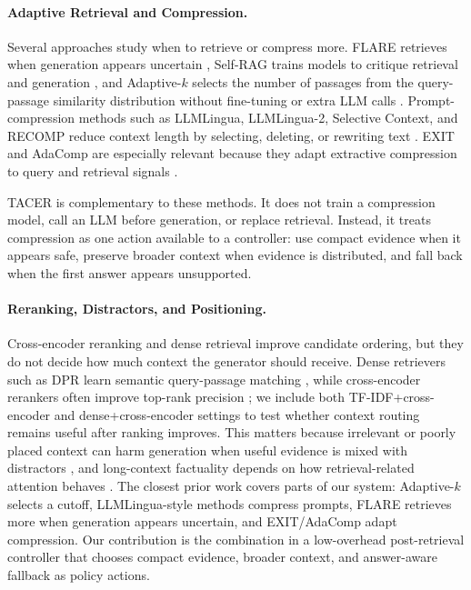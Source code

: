 \documentclass[11pt]{article}
\begin{document}
\paragraph{Adaptive Retrieval and Compression.}
Several approaches study when to retrieve or compress more. FLARE retrieves when generation appears uncertain \citep{jiang2023flare}, Self-RAG trains models to critique retrieval and generation \citep{asai2023selfrag}, and Adaptive-$k$ selects the number of passages from the query-passage similarity distribution without fine-tuning or extra LLM calls \citep{taguchi2025adaptivek}. Prompt-compression methods such as LLMLingua, LLMLingua-2, Selective Context, and RECOMP reduce context length by selecting, deleting, or rewriting text \citep{jiang2023llmlingua,pan2024llmlingua2,li2023selectivecontext,xu2023recomp}. EXIT and AdaComp are especially relevant because they adapt extractive compression to query and retrieval signals \citep{hwang2025exit,zhang2024adacomp}.

TACER is complementary to these methods. It does not train a compression model, call an LLM before generation, or replace retrieval. Instead, it treats compression as one action available to a controller: use compact evidence when it appears safe, preserve broader context when evidence is distributed, and fall back when the first answer appears unsupported.

\paragraph{Reranking, Distractors, and Positioning.}
Cross-encoder reranking and dense retrieval improve candidate ordering, but they do not decide how much context the generator should receive. Dense retrievers such as DPR learn semantic query-passage matching \citep{karpukhin2020dpr}, while cross-encoder rerankers often improve top-rank precision \citep{nogueira2019bert}; we include both TF-IDF+cross-encoder and dense+cross-encoder settings to test whether context routing remains useful after ranking improves. This matters because irrelevant or poorly placed context can harm generation when useful evidence is mixed with distractors \citep{shi2023distracted}, and long-context factuality depends on how retrieval-related attention behaves \citep{wu2024retrievalhead}. The closest prior work covers parts of our system: Adaptive-$k$ selects a cutoff, LLMLingua-style methods compress prompts, FLARE retrieves more when generation appears uncertain, and EXIT/AdaComp adapt compression. Our contribution is the combination in a low-overhead post-retrieval controller that chooses compact evidence, broader context, and answer-aware fallback as policy actions.
\end{document}
